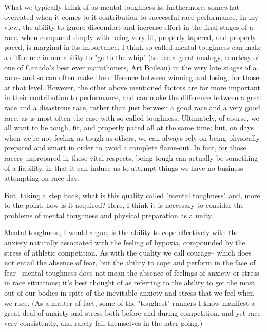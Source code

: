 What we typically think of as mental toughness is, furthermore, somewhat overrated when it comes to it contribution to successful race performance. In my view, the ability to ignore discomfort and increase effort in the final stages of a race, when compared simply with being very fit, properly tapered, and properly paced, is marginal in its importance. I think so-called mental toughness can make a difference in our ability to "go to the whip" (to use a great analogy, courtesy of one of Canada's best ever marathoners, Art Boileau) in the very late stages of a race-- and so can often make the difference between winning and losing, for those at that level. However, the other above mentioned factors are far more important in their contribution to performance, and can make the difference between a great race and a disastrous race, rather than just between a good race and a very good race, as is most often the case with so-called toughness. Ultimately, of course, we all want to be tough, fit, and properly paced all at the same time; but, on days when we're not feeling as tough as others, we can always rely on being physically prepared and smart in order to avoid a complete flame-out. In fact, for those racers unprepared in these vital respects, being tough can actually be something of a liability, in that it can induce us to attempt things we have no business attempting on race day.

But, taking a step back, what is this quality called "mental toughness" and, more to the point, how is it acquired? Here, I think it is necessary to consider the problems of mental toughness and physical preparation as a unity.

Mental toughness, I would argue, is the ability to cope effectively with the anxiety naturally associated with the feeling of hypoxia, compounded by the stress of athletic competition. As with the quality we call courage-- which does not entail the absence of fear, but the ability to cope and perform in the face of fear-- mental toughness does not mean the absence of feelings of anxiety or stress in race situations; it's best thought of as referring to the ability to get the most out of our bodies in spite of the inevitable anxiety and stress that we feel when we race. (As a matter of fact, some of the "toughest" runners I know manifest a great deal of anxiety and stress both before and during competition, and yet race very consistently, and rarely fail themselves in the later going.)

